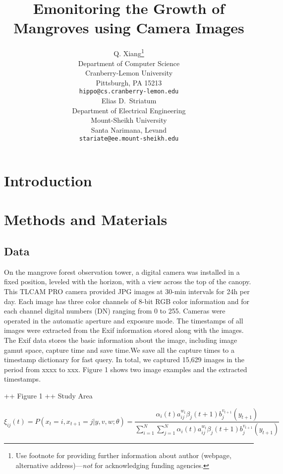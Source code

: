 \documentclass{article}
\title{Emonitoring the Growth of Mangroves using Camera Images}
\author{
  Q. Xiang\thanks{Use footnote for providing further
    information about author (webpage, alternative
    address)---\emph{not} for acknowledging funding agencies.} \\
  Department of Computer Science\\
  Cranberry-Lemon University\\
  Pittsburgh, PA 15213 \\
  \texttt{hippo@cs.cranberry-lemon.edu} \\
   \And
 Elias D.~Striatum \\
  Department of Electrical Engineering\\
  Mount-Sheikh University\\
  Santa Narimana, Levand \\
  \texttt{stariate@ee.mount-sheikh.edu} \\
}
\begin{document}
\maketitle

\begin{abstract}
\lipsum[1]
\end{abstract}




\section{Introduction}
\lipsum[2]
\lipsum[3]


\section{Methods and Materials}
\label{sec:headings}


\subsection{Data}
On the mangrove forest observation tower, a digital camera was installed in a fixed position, leveled with the horizon, with a view across the top of the canopy. This TLCAM PRO camera provided JPG images at 30-min intervals for 24h per day. Each image has three color channels of 8-bit RGB color information and for each channel digital numbers (DN) ranging from 0 to 255. Cameras were operated in the automatic aperture and exposure mode. The timestamps of all images were extracted from the Exif information stored along with the images. The Exif data stores the basic information about the image, including image gamut space, capture time and save time.We save all the capture times to a timestamp dictionary for fast query. In total, we captured 15,629 images in the period from xxxx to xxx.  Figure 1 shows two image examples and the extracted timestamps.

++ Figure 1 
++ Study Area


\begin{equation}
\xi _{ij}(t)=P(x_{t}=i,x_{t+1}=j|y,v,w;\theta)= {\frac {\alpha _{i}(t)a^{w_t}_{ij}\beta _{j}(t+1)b^{v_{t+1}}_{j}(y_{t+1})}{\sum _{i=1}^{N} \sum _{j=1}^{N} \alpha _{i}(t)a^{w_t}_{ij}\beta _{j}(t+1)b^{v_{t+1}}_{j}(y_{t+1})}}
\end{equation}
\end{document}
